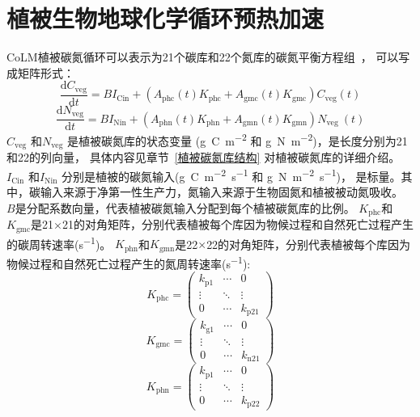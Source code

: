 \section{植被生物地球化学循环预热加速}
CoLM植被碳氮循环可以表示为21个碳库和22个氮库的碳氮平衡方程组~\citep{lu2020full}，
可以写成矩阵形式：
\begin{equation}
  \frac{{\mathrm {d}} C_{\mathrm{veg}}}{{\mathrm {d}} t}=B I_{\mathrm{Cin}}+\left(A_{\mathrm{p h c}}(t) K_{\mathrm{p h c}}+A_{\mathrm{gmc}}(t) K_{\mathrm{gmc}}\right) C_{\mathrm{veg}}(t)
\end{equation}
\begin{equation}
  \frac{{\mathrm {d}} N_{\text {veg}}}{{\mathrm {d}} t}=B I_{\mathrm{Nin}}+\left(A_{\mathrm{phn}}(t) K_{\mathrm{phn}}+A_{\mathrm{gmn}}(t) K_{\mathrm{gmn}}\right) N_{\text {veg }}(t)
\end{equation}
$C_{\mathrm{veg}}$ 和$N_{\mathrm{veg}}$ 是植被碳氮库的状态变量 (\unit{g.C.m^{-2}} 和 \unit{g.N.m^{-2}})，是长度分别为21和22的列向量，
具体内容见章节~\ref{植被碳氮库结构} 对植被碳氮库的详细介绍。$I_{\mathrm{Cin}}$ 和$I_{\mathrm{Nin}}$ 分别是植被的碳氮输入(\unit{g.C.m^{-2}.s^{-1}} 和 \unit{g.N.m^{-2}.s^{-1}})，
是标量。其中，碳输入来源于净第一性生产力，氮输入来源于生物固氮和植被被动氮吸收。
$B$是分配系数向量，代表植被碳氮输入分配到每个植被碳氮库的比例。
$K_{\mathrm{phc}}$和$K_{\mathrm{gmc}}$是21$\times$21的对角矩阵，分别代表植被每个库因为物候过程和自然死亡过程产生的碳周转速率(\unit{s^{-1}})。
$K_{\mathrm{phn}}$和$K_{\mathrm{gmn}}$是22$\times$22的对角矩阵，分别代表植被每个库因为物候过程和自然死亡过程产生的氮周转速率(\unit{s^{-1}}):
\begin{equation}
  K_{\mathrm{p h c}}=\left(\begin{array}{ccc}k_{\mathrm{p 1}} & \cdots & 0 \\ \vdots & \ddots & \vdots \\ 0 & \cdots & k_{\mathrm{p 21}}\end{array}\right)
\end{equation}
\begin{equation}
  K_{\mathrm{gmc}}=\left(\begin{array}{ccc}k_{\mathrm{g 1}} & \cdots & 0 \\ \vdots & \ddots & \vdots \\ 0 & \cdots & k_{\mathrm{n 21}}\end{array}\right)
\end{equation}
\begin{equation}
  K_{\mathrm{phn}}=\left(\begin{array}{ccc}k_{\mathrm{p 1}} & \cdots & 0 \\ \vdots & \ddots & \vdots \\ 0 & \cdots & k_{\mathrm{p 22}}\end{array}\right)
\end{equation}
